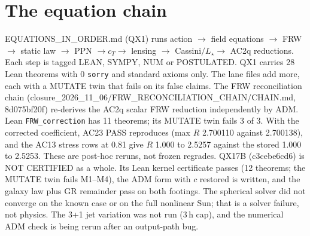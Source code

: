 \documentclass[10pt]{article}
\begin{document}
\section{The equation chain}
EQUATIONS\_IN\_ORDER.md (QX1) runs action $\to$ field equations $\to$ FRW $\to$ static law $\to$ PPN $\to c_T\to$ lensing $\to$ Cassini$/L_\star\to$ AC2q reductions. Each step is tagged LEAN, SYMPY, NUM or POSTULATED. QX1 carries 28 Lean theorems with 0 \texttt{sorry} and standard axioms only. The lane files add more, each with a MUTATE twin that fails on its false claims. The FRW reconciliation chain (closure\_2026\_11\_06/FRW\_RECONCILIATION\_CHAIN/CHAIN.md, 8d075bf20f) re-derives the AC2q scalar FRW reduction independently by ADM. Lean \texttt{FRW\_correction} has 11 theorems; its MUTATE twin fails 3 of 3. With the corrected coefficient, AC23 PASS reproduces (max $R$ 2.700110 against 2.700138), and the AC13 stress rows at 0.81 give $R$ 1.000 to 2.5257 against the stored 1.000 to 2.5253. These are post-hoc reruns, not frozen regrades. QX17B (c3cebe6cd6) is NOT CERTIFIED as a whole. Its Lean kernel certificate passes (12 theorems; the MUTATE twin fails M1--M4), the ADM form with $c$ restored is written, and the galaxy law plus GR remainder pass on both footings. The spherical solver did not converge on the known case or on the full nonlinear Sun; that is a solver failure, not physics. The 3+1 jet variation was not run (3\,h cap), and the numerical ADM check is being rerun after an output-path bug.
\end{document}
